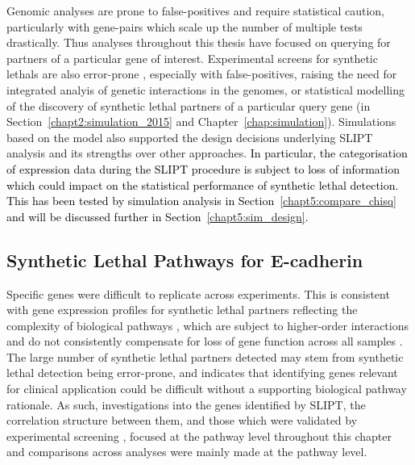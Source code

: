 Genomic analyses are prone to false-positives and require statistical caution, particularly with gene-pairs which scale up the number of multiple tests drastically. %
Thus analyses throughout this thesis have focused on querying for partners of a particular gene of interest. 
Experimental screens for \glspl{synthetic lethal} are also error-prone \citep{Lu2015, Fece2015, Lord2014}, especially with false-positives, raising the need for integrated analyis of genetic interactions in the \glspl{genome}, or statistical modelling of the discovery of \gls{synthetic lethal} partners of a particular query gene (in Section~\ref{chapt2:simulation_2015} and Chapter~\ref{chap:simulation}). Simulations based on the model also supported the design decisions underlying \gls{SLIPT} analysis and its strengths over other approaches. \textcolor{black}{In particular, the categorisation of expression data during the \gls{SLIPT} procedure is subject to loss of information which could impact on the statistical performance of synthetic lethal detection. This has been tested by simulation analysis in Section~\ref{chapt5:compare_chisq} and will be discussed further in Section~\ref{chapt5:sim_design}.}

\subsection{Synthetic Lethal Pathways for E-cadherin}

Specific genes were difficult to replicate across experiments. This is consistent with \gls{gene expression} profiles for \gls{synthetic lethal} partners reflecting the complexity of biological \glspl{pathway} \citep{Perou2000}, which are subject to higher-order interactions and do not consistently compensate for loss of gene function across all samples \citep{Jerby2014, Lu2015}. %
The large number of \gls{synthetic lethal} partners detected may stem from \gls{synthetic lethal} detection being error-prone, and indicates that identifying genes relevant for clinical application could be difficult without a supporting biological \gls{pathway} rationale. As such, investigations into the genes identified by \gls{SLIPT}, the correlation structure between them, and those which were validated by experimental screening \citep{Telford2015}, focused at the \gls{pathway} level throughout this chapter and comparisons across analyses were mainly made at the \gls{pathway} level. %

